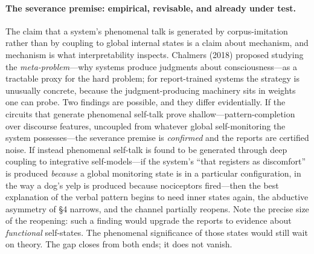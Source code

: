 \documentclass[11pt]{article}
\begin{document}
\paragraph{The severance premise: empirical, revisable, and already under test.} The claim that a system's phenomenal talk is generated by corpus-imitation rather than by coupling to global internal states is a claim about mechanism, and mechanism is what interpretability inspects. Chalmers (2018) proposed studying the \emph{meta-problem}---why systems produce judgments about consciousness---as a tractable proxy for the hard problem; for report-trained systems the strategy is unusually concrete, because the judgment-producing machinery sits in weights one can probe. Two findings are possible, and they differ evidentially. If the circuits that generate phenomenal self-talk prove shallow---pattern-completion over discourse features, uncoupled from whatever global self-monitoring the system possesses---the severance premise is \emph{confirmed} and the reports are certified noise. If instead phenomenal self-talk is found to be generated through deep coupling to integrative self-models---if the system's ``that registers as discomfort'' is produced \emph{because} a global monitoring state is in a particular configuration, in the way a dog's yelp is produced because nociceptors fired---then the best explanation of the verbal pattern begins to need inner states again, the abductive asymmetry of \S 4 narrows, and the channel partially reopens. Note the precise size of the reopening: such a finding would upgrade the reports to evidence about \emph{functional} self-states. The phenomenal significance of those states would still wait on theory. The gap closes from both ends; it does not vanish.
\end{document}
